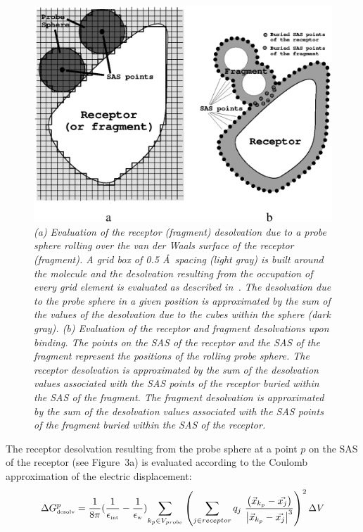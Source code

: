 \documentclass[a4paper,12pt,titlepage]{article}
\begin{document}
\begin{figure}
\begin{center}
\includegraphics[scale=0.9]{figures/fig2.ps}
\end{center}
\caption{\it
(a) Evaluation of the receptor (fragment) desolvation due to a probe sphere 
rolling over the van der Waals surface of the receptor (fragment). A grid box of
0.5 \AA~spacing (light 
gray) is built around the molecule and the desolvation resulting from the 
occupation of every grid element is evaluated as described 
in~\cite{Majeux:Exhaustive}. The desolvation due to the probe sphere in a 
given position is approximated by the sum of the values of the desolvation due to
the cubes within the sphere (dark gray).
(b) Evaluation of the receptor and fragment desolvations upon binding. The 
points on the SAS of the receptor and the SAS of the fragment represent the 
positions of the rolling probe sphere. The receptor desolvation is approximated 
by the sum of the desolvation values associated with the SAS points of the 
receptor buried within the SAS of the fragment. The fragment desolvation is 
approximated by the sum of the desolvation values associated with the SAS 
points of the fragment buried within the SAS of the receptor.
}
\end{figure}
The receptor desolvation resulting from the probe sphere
at a point $p$ on the SAS of the receptor
(see Figure~3a) is evaluated according to the Coulomb approximation of the 
electric displacement: 
%
\begin{equation}
%
\Delta G^{p}_{\mbox{\tiny desolv}} = {1 \over {8\pi} } 
(\frac{1}{\epsilon_{\mbox{\tiny int}}} - \frac{1}{\epsilon_{\mbox {\tiny w}}}) 
{\sum_{k_p \in V_{probe}} \left( \sum_{j \in {\small receptor}} q_j 
\ \frac{\left(\vec{x}_{k_p}-\vec{x_j}\right)} 
{\left|\vec{x}_{k_p}-\vec{x_j}\right| ^3} \right)^2  \Delta V}  
\label{eq:redesofinal} 
%
\end{equation}
\end{document}
